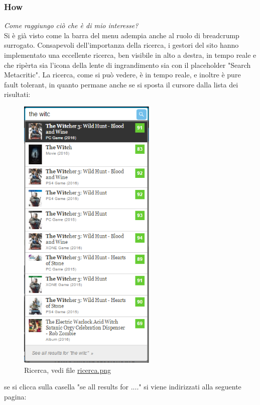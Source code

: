 \documentclass[12pt]{article}
\begin{document}
\subsubsection{How}
\textit{Come raggiungo ciò che è di mio interesse?}\\
Si è già visto come la barra del menu adempia anche al ruolo di breadcrump surrogato. Consapevoli dell'importanza della ricerca, i gestori del sito hanno implementato una eccellente ricerca, ben visibile in alto a destra, in tempo reale e che ripèrta sia l'icona della lente di ingrandimento sia con il placeholder "Search Metacritic". La ricerca, come si può vedere, è in tempo reale, e inoltre è pure fault tolerant, in quanto permane anche se si sposta il cursore dalla lista dei risultati:
\begin{figure}[H]
	\begin{center}
		\includegraphics[height=13.5cm]{ricerca.png}
		\caption{Ricerca, vedi file \href{ricerca.png}{ricerca.png}}
	\end{center}
\end{figure}
se si clicca sulla casella "se all results for ...." si viene indirizzati alla seguente pagina:
\end{document}

